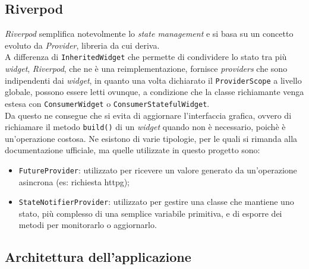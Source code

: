 \subsection{Riverpod}
\label{subsec:riverpod}

\emph{Riverpod} semplifica notevolmente lo \emph{state management} e si basa su un concetto evoluto da \emph{Provider}\cite{site:provider}, libreria da cui deriva.\\
A differenza di \lstinline{InheritedWidget}\cite{site:inheritw} che permette di condividere lo stato tra più \emph{widget}, \emph{Riverpod}, che ne è una reimplementazione, fornisce \emph{providers} che sono indipendenti dai \emph{widget}, in quanto una volta dichiarato il \lstinline{ProviderScope} a livello globale, possono essere letti ovunque, a condizione che la classe richiamante venga estesa con \lstinline{ConsumerWidget} o \lstinline{ConsumerStatefulWidget}\cite{site:reading-provider}. \\
Da questo ne consegue che si evita di aggiornare l'interfaccia grafica, ovvero di richiamare il metodo \lstinline{build()} di un \emph{widget} quando non è necessario, poichè è un'operazione costosa.
Ne esistono di varie tipologie, per le quali si rimanda alla documentazione ufficiale\cite{site:riverpod}, ma quelle utilizzate in questo progetto sono:
\begin{itemize}
    \item \lstinline{FutureProvider}\cite{site:future-provider}: utilizzato per ricevere un valore generato da un'operazione asincrona (es: richiesta \gls{httpg}\glsoccur);
    \item \lstinline{StateNotifierProvider}\cite{site:state-notifier-provider}: utilizzato per gestire una classe che mantiene uno stato, più complesso di una semplice variabile primitiva, e di esporre dei metodi per monitorarlo o aggiornarlo.
\end{itemize}

\subsection{Architettura dell'applicazione}
\label{subsec:architettura-app}

